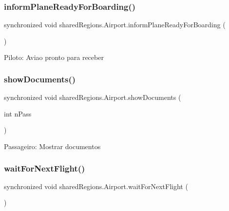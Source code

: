 \subsubsection{\texorpdfstring{inform\+Plane\+Ready\+For\+Boarding()}{informPlaneReadyForBoarding()}}
{\footnotesize\ttfamily synchronized void shared\+Regions.\+Airport.\+inform\+Plane\+Ready\+For\+Boarding (\begin{DoxyParamCaption}{ }\end{DoxyParamCaption})\hspace{0.3cm}{\ttfamily [inline]}}

Piloto\+: Aviao pronto para receber \mbox{\label{classshared_regions_1_1_airport_a1a232f9b0f1311fd95665de744d871c8}} 
\subsubsection{\texorpdfstring{show\+Documents()}{showDocuments()}}
{\footnotesize\ttfamily synchronized void shared\+Regions.\+Airport.\+show\+Documents (\begin{DoxyParamCaption}\item[{int}]{n\+Pass }\end{DoxyParamCaption})\hspace{0.3cm}{\ttfamily [inline]}}

Passageiro\+: Mostrar documentos \mbox{\label{classshared_regions_1_1_airport_a7ee042433a9a1633605570a11a294ea0}} 
\subsubsection{\texorpdfstring{wait\+For\+Next\+Flight()}{waitForNextFlight()}}
{\footnotesize\ttfamily synchronized void shared\+Regions.\+Airport.\+wait\+For\+Next\+Flight (\begin{DoxyParamCaption}{ }\end{DoxyParamCaption})\hspace{0.3cm}{\ttfamily [inline]}}


